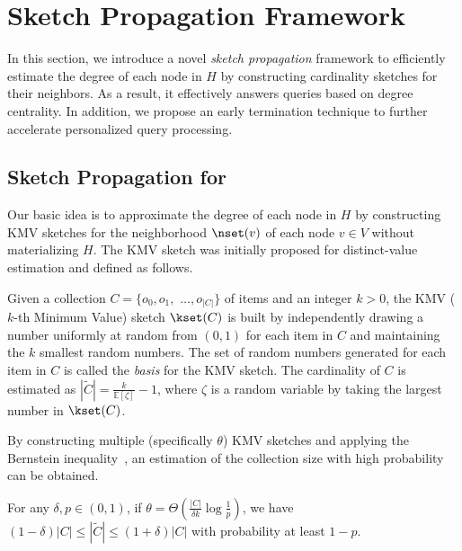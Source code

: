 \section{Sketch Propagation Framework}
\label{sec:scopeprop}

In this section, we introduce a novel \emph{sketch propagation} framework to efficiently estimate the degree of each node in $H$ by constructing cardinality sketches for their neighbors. As a result, it effectively answers \ced queries based on degree centrality.
In addition, we propose an early termination technique to further accelerate personalized \ced query processing.

\subsection{Sketch Propagation for \ced}
\label{sec:sketch-framework}

Our basic idea is to approximate the degree of each node in $H$ by constructing KMV sketches for the neighborhood $\nset(v)$ of each node $v\in V$ without materializing $H$. The KMV sketch was initially proposed for distinct-value estimation \cite{beyer2007synopses} and defined as follows.
\begin{definition}\label{def:kmv}
  Given a collection $C=\{o_0, o_1,$ $ \dots, o_{|C|}\}$ of items and an integer $k > 0$, the KMV ($k$-th Minimum Value) sketch $\kset(C)$ is built by independently drawing a number uniformly at random from $(0, 1)$ for each item in $C$ and maintaining the $k$ smallest random numbers. The set of random numbers generated for each item in $C$ is called the \emph{basis} for the KMV sketch. The cardinality of $C$ is estimated as $|\widetilde{C}|=\frac{k}{\mathbb{E}[\zeta]}-1$, where $\zeta$ is a random variable by taking the largest number in $\kset(C)$.
\end{definition}

By constructing multiple (specifically $\theta$) KMV sketches and applying the Bernstein inequality~\cite{audibert2007tuning}, an estimation of the collection size with high probability can be obtained. 
\begin{lemma}\label{theorem:dconcentration}
  For any $\delta, p \in (0, 1)$, if $\theta = \Theta(\frac{|C|}{\delta k}\log{\frac{1}{p}})$, we have $(1 - \delta) |C| \leq |\widetilde{C}| \leq (1+\delta) |C|$ with probability at least $1 - p$.
\end{lemma}

